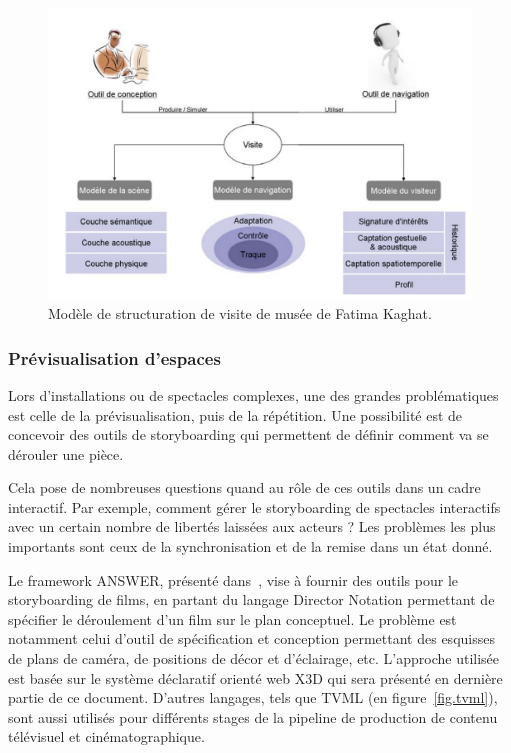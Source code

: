 \documentclass[french,12pt]{article}
\begin{document}
\begin{figure}[h]
    \centering
    \includegraphics[scale=0.25]{images/modele_visite_musee.png}
    \caption{Modèle de structuration de visite de musée de Fatima Kaghat.}
    \label{fig.visite.musee}
\end{figure}

\subsubsection{Prévisualisation d'espaces}
Lors d'installations ou de spectacles complexes, une des grandes problématiques est celle de la prévisualisation, puis de la répétition.
Une possibilité est de concevoir des outils de storyboarding qui permettent de définir comment va se dérouler une pièce.

Cela pose de nombreuses questions quand au rôle de ces outils dans un cadre interactif. Par exemple, comment gérer le storyboarding de spectacles interactifs avec 
un certain nombre de libertés laissées aux acteurs ? Les problèmes les plus importants sont ceux de la synchronisation et de la remise dans un état donné.

Le framework ANSWER, présenté dans~\cite{jung_storyboarding_2010}, vise à fournir des outils pour le storyboarding de films, en partant 
du langage Director Notation permettant de spécifier le déroulement d'un film sur le plan conceptuel. Le problème est notamment
celui d'outil de spécification et conception permettant des esquisses de plans de caméra, de positions de décor et d'éclairage, etc.
L'approche utilisée est basée sur le système déclaratif orienté web X3D qui sera présenté en dernière partie de ce document.
D'autres langages, tels que TVML (en figure~\ref{fig.tvml}), sont aussi utilisés pour différents stages de la pipeline de production de contenu télévisuel et cinématographique.
\end{document}
